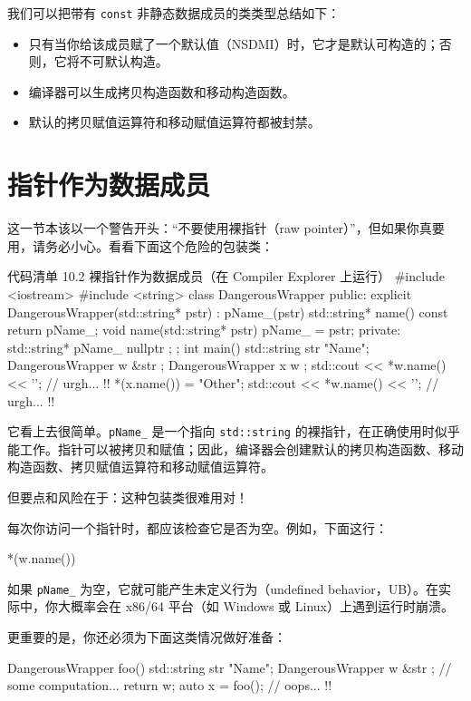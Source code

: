 我们可以把带有 \texttt{const} 非静态数据成员的类类型总结如下：

\begin{itemize}
\item 只有当你给该成员赋了一个默认值（NSDMI）时，它才是默认可构造的；否则，它将不可默认构造。
\item 编译器可以生成拷贝构造函数和移动构造函数。
\item 默认的拷贝赋值运算符和移动赋值运算符都被封禁。
\end{itemize}


\section{指针作为数据成员}

这一节本该以一个警告开头：“不要使用裸指针（raw pointer）”，但如果你真要用，请务必小心。看看下面这个危险的包装类：

\begin{codeboxt}[cpp]{代码清单 10.2 裸指针作为数据成员（在 Compiler Explorer 上运行）}
#include <iostream>
#include <string>
class DangerousWrapper {
public:
explicit DangerousWrapper(std::string* pstr) : pName_(pstr) { }
std::string* name() const { return pName_; }
void name(std::string* pstr) { pName_ = pstr; }
private:
std::string* pName_ { nullptr };
};
int main() {
std::string str { "Name"};
DangerousWrapper w { &str };
DangerousWrapper x { w };
std::cout << *w.name() << '\n'; // urgh... !!
*(x.name()) = "Other";
std::cout << *w.name() << '\n'; // urgh... !!
}
\end{codeboxt}

它看上去很简单。\texttt{pName\_} 是一个指向 \texttt{std::string} 的裸指针，在正确使用时似乎能工作。指针可以被拷贝和赋值；因此，编译器会创建默认的拷贝构造函数、移动构造函数、拷贝赋值运算符和移动赋值运算符。

但要点和风险在于：这种包装类很难用对！

每次你访问一个指针时，都应该检查它是否为空。例如，下面这行：

\begin{codebox}[cpp]
*(w.name())
\end{codebox}

如果 \texttt{pName\_} 为空，它就可能产生未定义行为（undefined behavior，UB）。在实际中，你大概率会在 x86/64 平台（如 Windows 或 Linux）上遇到运行时崩溃。

更重要的是，你还必须为下面这类情况做好准备：

\begin{codebox}[cpp]
DangerousWrapper foo() {
std::string str { "Name"};
DangerousWrapper w { &str };
// some computation...
return w;
}
auto x = foo(); // oops... !!
\end{codebox}

